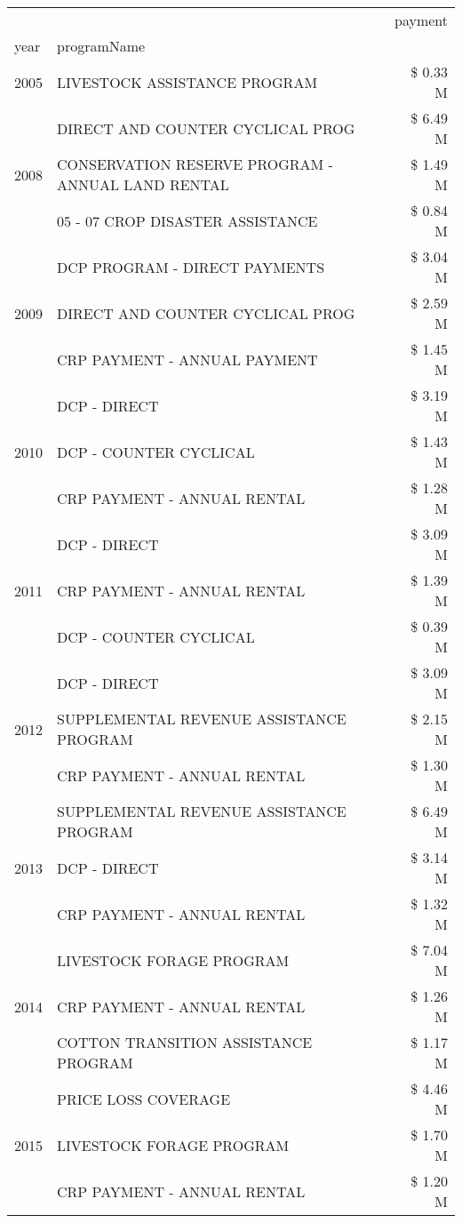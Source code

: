 \begin{tabular}{llr}
\toprule
 &  & payment \\
year & programName &  \\
\midrule
2005 & LIVESTOCK ASSISTANCE PROGRAM & \$ 0.33 M \\
\cline{1-3}
\multirow[t]{3}{*}{2008} & DIRECT AND COUNTER CYCLICAL PROG & \$ 6.49 M \\
 & CONSERVATION RESERVE PROGRAM - ANNUAL LAND RENTAL & \$ 1.49 M \\
 & 05 - 07 CROP DISASTER ASSISTANCE & \$ 0.84 M \\
\cline{1-3}
\multirow[t]{3}{*}{2009} & DCP PROGRAM - DIRECT PAYMENTS & \$ 3.04 M \\
 & DIRECT AND COUNTER CYCLICAL PROG & \$ 2.59 M \\
 & CRP PAYMENT - ANNUAL PAYMENT & \$ 1.45 M \\
\cline{1-3}
\multirow[t]{3}{*}{2010} & DCP - DIRECT & \$ 3.19 M \\
 & DCP - COUNTER CYCLICAL & \$ 1.43 M \\
 & CRP PAYMENT - ANNUAL RENTAL & \$ 1.28 M \\
\cline{1-3}
\multirow[t]{3}{*}{2011} & DCP - DIRECT & \$ 3.09 M \\
 & CRP PAYMENT - ANNUAL RENTAL & \$ 1.39 M \\
 & DCP - COUNTER CYCLICAL & \$ 0.39 M \\
\cline{1-3}
\multirow[t]{3}{*}{2012} & DCP - DIRECT & \$ 3.09 M \\
 & SUPPLEMENTAL REVENUE ASSISTANCE PROGRAM & \$ 2.15 M \\
 & CRP PAYMENT - ANNUAL RENTAL & \$ 1.30 M \\
\cline{1-3}
\multirow[t]{3}{*}{2013} & SUPPLEMENTAL REVENUE ASSISTANCE PROGRAM & \$ 6.49 M \\
 & DCP - DIRECT & \$ 3.14 M \\
 & CRP PAYMENT - ANNUAL RENTAL & \$ 1.32 M \\
\cline{1-3}
\multirow[t]{3}{*}{2014} & LIVESTOCK FORAGE PROGRAM & \$ 7.04 M \\
 & CRP PAYMENT - ANNUAL RENTAL & \$ 1.26 M \\
 & COTTON TRANSITION ASSISTANCE PROGRAM & \$ 1.17 M \\
\cline{1-3}
\multirow[t]{3}{*}{2015} & PRICE LOSS COVERAGE & \$ 4.46 M \\
 & LIVESTOCK FORAGE PROGRAM & \$ 1.70 M \\
 & CRP PAYMENT - ANNUAL RENTAL & \$ 1.20 M \\

\end{tabular}
